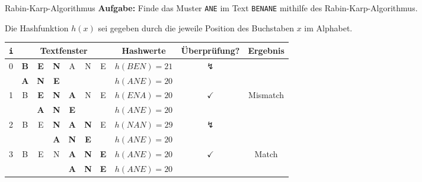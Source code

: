 \begin{example}{Rabin-Karp-Algorithmus}
    \textbf{Aufgabe:} Finde das Muster \texttt{ANE} im Text \texttt{BENANE} mithilfe des Rabin-Karp-Algorithmus.

    Die Hashfunktion $h(x)$ sei gegeben durch die jeweile Position des Buchstaben $x$ im Alphabet.

    \vspace{1em}

    \centering

    \begin{tabular}{|c|cccccc|c|c|c|}
        \hline
        \rowcolor{gray!25} \texttt{i} & \multicolumn{6}{c|}{Textfenster} & Hashwerte  & Überprüfung? & Ergebnis                                                                                                         \\
        \hline
        \multirow{2}{*}{0}            & \textbf{B}                       & \textbf{E} & \textbf{N}   & A          & N          & E          & $h(BEN) = 21$ & \multirow{2}{*}{$\lightning$} & \multirow{2}{*}{}         \\
                                      & \textbf{A}                       & \textbf{N} & \textbf{E}   &            &            &            & $h(ANE) = 20$ &                               &                           \\
        \hline
        \multirow{2}{*}{1}            & B                                & \textbf{E} & \textbf{N}   & \textbf{A} & N          & E          & $h(ENA) = 20$ & \multirow{2}{*}{$\checkmark$} & \multirow{2}{*}{Mismatch} \\
                                      &                                  & \textbf{A} & \textbf{N}   & \textbf{E} &            &            & $h(ANE) = 20$ &                               &                           \\
        \hline
        \multirow{2}{*}{2}            & B                                & E          & \textbf{N}   & \textbf{A} & \textbf{N} & E          & $h(NAN) = 29$ & \multirow{2}{*}{$\lightning$} & \multirow{2}{*}{}         \\
                                      &                                  &            & \textbf{A}   & \textbf{N} & \textbf{E} &            & $h(ANE) = 20$ &                               &                           \\
        \hline
        \multirow{2}{*}{3}            & B                                & E          & N            & \textbf{A} & \textbf{N} & \textbf{E} & $h(ANE) = 20$ & \multirow{2}{*}{$\checkmark$} & \multirow{2}{*}{Match}    \\
                                      &                                  &            &              & \textbf{A} & \textbf{N} & \textbf{E} & $h(ANE) = 20$ &                               &                           \\
        \hline
    \end{tabular}
\end{example}

